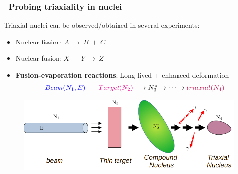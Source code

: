 \documentclass{beamer}
\begin{document}
\begin{frame}
	\frametitle{\faSearch\ Probing triaxiality in nuclei}
    Triaxial nuclei can be observed/obtained in several experiments:
    \begin{itemize}
        \item Nuclear fission: $A\ \rightarrow\ B\ +\ C$
        \item Nuclear fusion: $X\ +\ Y\ \rightarrow\ Z$
        \item \textbf{Fusion-evaporation reactions}: {\color{red}Long-lived} + {\color{red}enhanced deformation}
        \vspace{-0.3cm}
        \begin{align}
            {\color{blue}Beam(N_1,E)}\ +\ {\color{magenta}Target(N_2)}\longrightarrow N_3^*\rightarrow\dots\rightarrow {\color{purple}triaxial(N_4)} \nonumber
        \end{align}
    \end{itemize}
    \begin{figure}
        \centering
        \includegraphics[scale=0.6]{figures/fusion-evaporation.png}
    \end{figure}
\end{frame}
\end{document}
